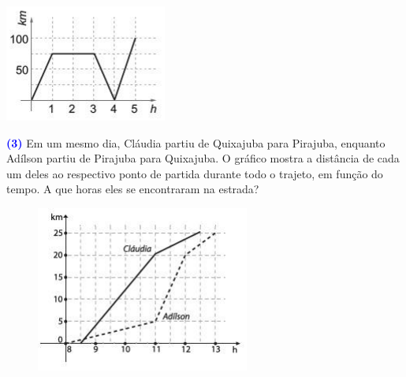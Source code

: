 \documentclass[12pt, a4paper]{article}
\newcommand{\negrito}[1]{\mbox{\boldmath{$#1$}}}
\begin{document}
\begin{tasks}[counter-format={(tsk[a])},label-width=3.6ex, label-format = {\bfseries}, column-sep = {0pt}]
\task[\textcolor{Floresta}{$\negrito{(e)} $}] 
\includegraphics[scale=1.1]{Figuras/12enc2ciclo1.png}
\end{tasks}
\textcolor{blue}{\bf(3)} Em um mesmo dia, Cláudia partiu de Quixajuba para Pirajuba, enquanto Adílson partiu
de Pirajuba para Quixajuba. O gráfico mostra a distância de cada um deles ao respectivo ponto de partida durante todo o trajeto, em função do tempo. A que horas
eles se encontraram na estrada?
\begin{figure}[!h]
    \centering
\includegraphics{Figuras/13enc2ciclo1.png}
\end{figure}
\end{document}
